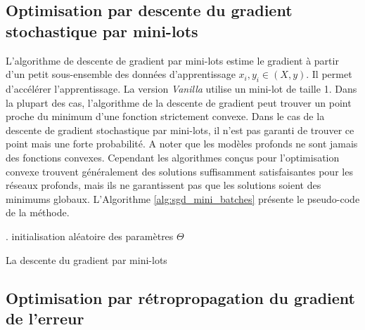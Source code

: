 \subsection{Optimisation par descente du gradient stochastique par mini-lots}

L'algorithme de descente de gradient par mini-lots estime le gradient à partir d'un petit sous-ensemble des données d'apprentissage $x_i, y_i \in (X,y)$.  Il permet d'accélérer l'apprentissage. La version \textit{Vanilla} utilise un mini-lot de taille 1. Dans la plupart des cas, l'algorithme de la descente de gradient peut trouver un point proche du minimum d'une fonction strictement convexe. Dans le cas de la descente de gradient stochastique par mini-lots, il n'est pas garanti de trouver ce point mais une forte probabilité. A noter que les modèles profonds ne sont jamais des fonctions convexes. Cependant les algorithmes conçus pour l'optimisation convexe trouvent généralement des solutions suffisamment satisfaisantes pour les réseaux profonds, mais ils ne garantissent pas que les solutions soient des minimums globaux. L'Algorithme \ref{alg:sgd_mini_batches} présente le pseudo-code de la méthode.

\begin{algorithm}[]
\small
\SetAlgoLined
{}
.
 initialisation aléatoire des paramètres $\Theta$\; 
 
 \caption{La descente du gradient par mini-lots}
   \label{alg:sgd_mini_batches}
\end{algorithm}

\subsection{Optimisation par rétropropagation du gradient de l'erreur}

